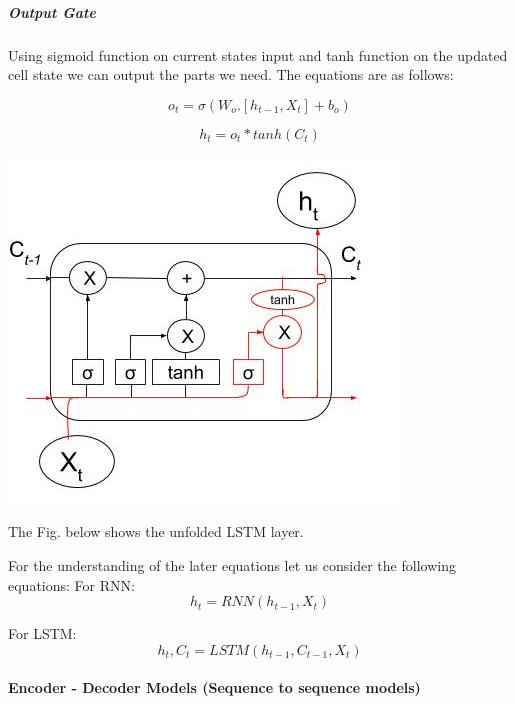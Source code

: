 \subparagraph{Output Gate}

Using sigmoid function on current states input and tanh function on the updated cell state we can output the parts we need. The equations are as follows:

\begin{equation}
	o_{t} = \sigma (W_{o} . [h_{t-1}, X_{t}] + b_{o})
\end{equation}

\begin{equation}
	h_{t}  = o_{t} * tanh( C_{t} )
\end{equation}

				\begin{center}
				\includegraphics[width=\linewidth]{figures/output-gate.jpg}	
				\label{fig: Output Gate}
				\end{center}

The Fig. below shows the unfolded LSTM layer.

For the understanding of the later equations let us consider the following equations:
For RNN: \begin{equation} h_{t} = RNN(h_{t-1}, X_{t}) \end{equation}

For LSTM: \begin{equation} h_{t}, C_{t} = LSTM(h_{t-1}, C_{t-1}, X_{t}) \end{equation} 

\paragraph{Encoder - Decoder Models (Sequence to sequence models)}

